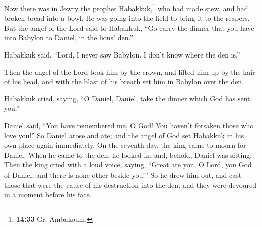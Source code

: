  Now there was in Jewry the prophet Habakkuk,\footnote{\textbf{14:33}
  Gr. Ambakoum.} who had made stew, and had broken bread into a bowl. He
was going into the field to bring it to the reapers.  But
the angel of the Lord said to Habakkuk, ``Go carry the dinner that you
have into Babylon to Daniel, in the lions' den.''

 Habakkuk said, ``Lord, I never saw Babylon. I don't know
where the den is.''

 Then the angel of the Lord took him by the crown, and
lifted him up by the hair of his head, and with the blast of his breath
set him in Babylon over the den.

 Habakkuk cried, saying, ``O Daniel, Daniel, take the
dinner which God has sent you.''

 Daniel said, ``You have remembered me, O God! You
haven't forsaken those who love you!''  So Daniel arose
and ate; and the angel of God set Habakkuk in his own place again
immediately.  On the seventh day, the king came to mourn
for Daniel. When he came to the den, he looked in, and, behold, Daniel
was sitting.  Then the king cried with a loud voice,
saying, ``Great are you, O Lord, you God of Daniel, and there is none
other beside you!''  So he drew him out, and cast those
that were the cause of his destruction into the den; and they were
devoured in a moment before his face.
